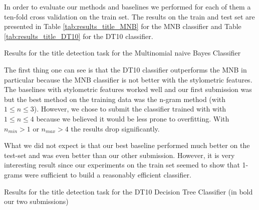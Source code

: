  In order to evaluate our methods and baselines we performed for each of them a ten-fold cross validation on the train set.
The results on the train and test set are presented in Table \ref{tab:results_title_MNB} for the MNB classifier and Table \ref{tab:results_title_DT10} for the DT10 classifier. %
\begin{table}

\caption{Results for the title detection task  for the Multinomial naive Bayes Classifier \label{tab:results_title_MNB}}
\end{table}
 The first thing one can see is that the DT10 classifier outperforms the MNB in particular because the MNB classifier is not better with the stylometric features.
The baselines with stylometric features worked well and our first submission was but the best method on the training data was the n-gram method (with $1\leq n \leq 3$). However, we chose to submit the classifier trained with with $1\leq n \leq 4$ because we believed it would be less prone to overfitting.
With $n_{min}>1$ or $n_{max}>4$ the results drop significantly.
 

  What we did not expect is that our best baseline performed much better on the test-set and was even better than our other submission. However, it is very interesting result since our experiments on the train set seemed to show that 1-grams were sufficient to build a reasonably efficient classifier.


\begin{table}

\caption{Results for the title detection task for the DT10 Decision Tree Classifier (in bold our two submissions) \label{tab:results_title_DT10}}
\end{table}
